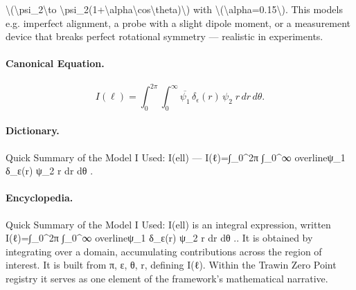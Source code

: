 \textbackslash{}(\textbackslash{}psi\_2\textbackslash{}to \textbackslash{}psi\_2(1+\textbackslash{}alpha\textbackslash{}cos\textbackslash{}theta)\textbackslash{}) with \textbackslash{}(\textbackslash{}alpha=0.15\textbackslash{}). This models e.g. imperfect alignment, a probe with a slight dipole moment, or a measurement device that breaks perfect rotational symmetry — realistic in experiments.

\paragraph{Canonical Equation.}
\[
I(\ell)=\int_0^{2\pi}\!\!\int_0^\infty \overline{\psi_1}\,\delta_\epsilon(r)\,\psi_2 \; r\,dr\,d\theta .
\]

\paragraph{Dictionary.}
Quick Summary of the Model I Used: I(ell) — I(ℓ)=∫\_0\textasciicircum{}2π ∫\_0\textasciicircum{}∞ overlineψ\_1 δ\_ε(r) ψ\_2 r dr dθ .

\paragraph{Encyclopedia.}
Quick Summary of the Model I Used: I(ell) is an integral expression, written I(ℓ)=∫\_0\textasciicircum{}2π ∫\_0\textasciicircum{}∞ overlineψ\_1 δ\_ε(r) ψ\_2 r dr dθ .. It is obtained by integrating over a domain, accumulating contributions across the region of interest. It is built from π, ε, θ, r, defining I(ℓ). Within the Trawin Zero Point registry it serves as one element of the framework's mathematical narrative.

